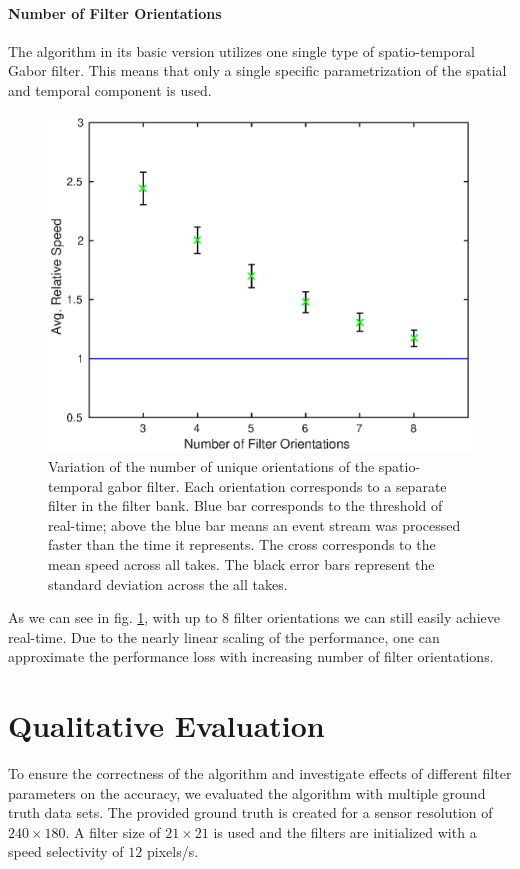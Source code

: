 \paragraph{Number of Filter Orientations}
The algorithm in its basic version utilizes one single type of spatio-temporal Gabor filter.
This means that only a single specific parametrization of the spatial and temporal component is used.

\begin{figure}[!htb]
	\centering
	\includegraphics[scale=.9]{gpu_fo.eps}
	\caption[Variation of the number of unique orientations of the spatio-temporal gabor filter.]{Variation of the number of unique orientations of the spatio-temporal gabor filter. Each orientation corresponds to a separate filter in the filter bank. Blue bar corresponds to the threshold of real-time; above the blue bar means an event stream was processed faster than the time it represents. The cross corresponds to the mean speed across all takes. The black error bars represent the standard deviation across the all takes.}
	\label{fig:gpu_fo}
\end{figure}

As we can see in fig. \ref{fig:gpu_fo}, with up to 8 filter orientations we can still easily achieve real-time.
Due to the nearly linear scaling of the performance, one can approximate the performance loss with increasing number of filter orientations.

\section{Qualitative Evaluation} 
To ensure the correctness of the algorithm and investigate effects of different filter parameters on the accuracy, we evaluated the algorithm with multiple ground truth data sets.
The provided ground truth is created for a sensor resolution of $240\times180$.
A filter size of $21\times21$ is used and the filters are initialized with a speed selectivity of $12$ pixels/s. 


